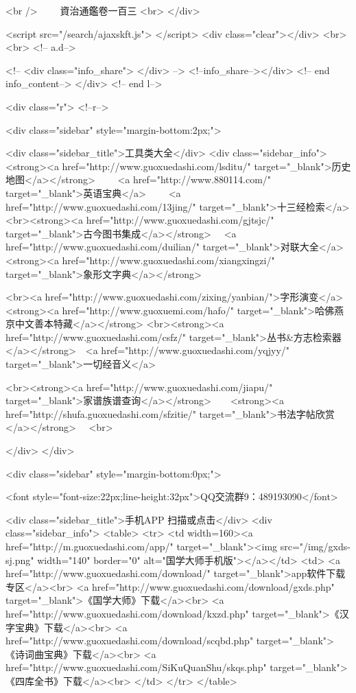 <br />
　　資治通鑑卷一百三  <br>
   </div> 

<script src="/search/ajaxskft.js"> </script>
 <div class="clear"></div>
<br>
<br>
 <!-- a.d-->

 <!--
<div class="info_share">
</div> 
-->
 <!--info_share--></div>   <!-- end info_content-->
  </div> <!-- end l-->

<div class="r">   <!--r-->



<div class="sidebar"  style="margin-bottom:2px;">

 
<div class="sidebar_title">工具类大全</div>
<div class="sidebar_info">
<strong><a href="http://www.guoxuedashi.com/lsditu/" target="_blank">历史地图</a></strong>　　
<a href="http://www.880114.com/" target="_blank">英语宝典</a>　　
<a href="http://www.guoxuedashi.com/13jing/" target="_blank">十三经检索</a>　
<br><strong><a href="http://www.guoxuedashi.com/gjtsjc/" target="_blank">古今图书集成</a></strong>　
<a href="http://www.guoxuedashi.com/duilian/" target="_blank">对联大全</a>　<strong><a href="http://www.guoxuedashi.com/xiangxingzi/" target="_blank">象形文字典</a></strong>　

<br><a href="http://www.guoxuedashi.com/zixing/yanbian/">字形演变</a>　　<strong><a href="http://www.guoxuemi.com/hafo/" target="_blank">哈佛燕京中文善本特藏</a></strong>
<br><strong><a href="http://www.guoxuedashi.com/csfz/" target="_blank">丛书&方志检索器</a></strong>　<a href="http://www.guoxuedashi.com/yqjyy/" target="_blank">一切经音义</a>　　

<br><strong><a href="http://www.guoxuedashi.com/jiapu/" target="_blank">家谱族谱查询</a></strong>　　<strong><a href="http://shufa.guoxuedashi.com/sfzitie/" target="_blank">书法字帖欣赏</a></strong>　
<br>

</div>
</div>


<div class="sidebar" style="margin-bottom:0px;">

<font style="font-size:22px;line-height:32px">QQ交流群9：489193090</font>


<div class="sidebar_title">手机APP 扫描或点击</div>
<div class="sidebar_info">
<table>
<tr>
	<td width=160><a href="http://m.guoxuedashi.com/app/" target="_blank"><img src="/img/gxds-sj.png" width="140"  border="0" alt="国学大师手机版"></a></td>
	<td>
<a href="http://www.guoxuedashi.com/download/" target="_blank">app软件下载专区</a><br>
<a href="http://www.guoxuedashi.com/download/gxds.php" target="_blank">《国学大师》下载</a><br>
<a href="http://www.guoxuedashi.com/download/kxzd.php" target="_blank">《汉字宝典》下载</a><br>
<a href="http://www.guoxuedashi.com/download/scqbd.php" target="_blank">《诗词曲宝典》下载</a><br>
<a href="http://www.guoxuedashi.com/SiKuQuanShu/skqs.php" target="_blank">《四库全书》下载</a><br>
</td>
</tr>
</table>

